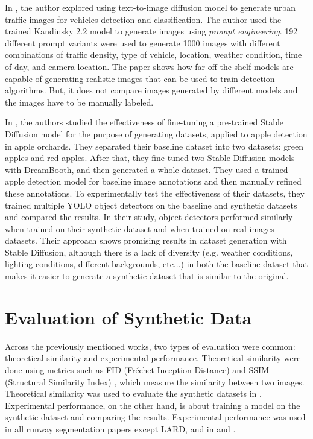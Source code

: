 In \cite{reutov_generating_2023}, the author explored using text-to-image
diffusion model to generate urban traffic images for vehicles detection and
classification. The author used the trained Kandinsky 2.2 model to generate
images using \emph{prompt engineering}. 192 different prompt variants were used to generate 1000 images with different combinations of traffic density, type of vehicle, location, weather condition, time of day, and camera location. The paper shows how far off-the-shelf models are capable of generating realistic images that can be used to train detection algorithms. But, it does not compare images generated by different models and the images have to be manually labeled. 

In \cite{voetman_big_2023}, the authors studied the effectiveness of fine-tuning
a pre-trained Stable Diffusion model for the purpose of generating datasets,
applied to apple detection in apple orchards. They separated their baseline
dataset into two datasets: green apples and red apples. After that, they
fine-tuned two Stable Diffusion models with DreamBooth, and then generated a
whole dataset. They used a trained apple detection model for baseline image
annotations and then manually refined these annotations. To experimentally test
the effectiveness of their datasets, they trained multiple YOLO \cite{redmon_you_2016} object detectors on the baseline and synthetic datasets and compared the results. In their study, object detectors performed similarly when trained on their synthetic dataset and when trained on real images datasets. Their approach shows promising results in dataset generation with Stable Diffusion, although there is a lack of diversity (e.g. weather conditions, lighting conditions, different backgrounds, etc...) in both the baseline dataset that makes it easier to generate a synthetic dataset that is similar to the original.

\section{Evaluation of Synthetic Data}

Across the previously mentioned works, two types of evaluation were common: theoretical similarity and experimental performance. Theoretical similarity were done using metrics such as FID (Fréchet Inception Distance) \cite{heusel_gans_2017} and SSIM (Structural Similarity Index) \cite{wang_image_2004}, which measure the similarity between two images. Theoretical similarity was used to evaluate the synthetic datasets in \cite{saragih_using_2024}. Experimental performance, on the other hand, is about training a model on the synthetic dataset and comparing the results. Experimental performance was used in all runway segmentation papers except LARD, and in \cite{reutov_generating_2023} and \cite{voetman_big_2023}.

